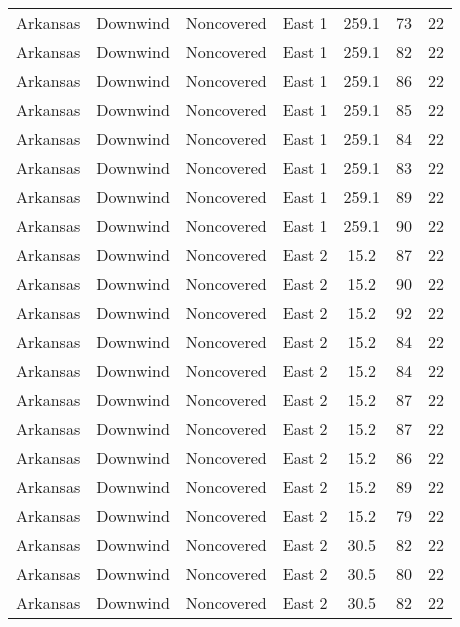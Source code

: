 \documentclass{article}
\begin{document}
\begin{longtable}[H]{ccccccc}
Arkansas & Downwind  & Noncovered & East 1        & 259.1        & 73          & 22  \\
Arkansas & Downwind  & Noncovered & East 1        & 259.1        & 82          & 22  \\
Arkansas & Downwind  & Noncovered & East 1        & 259.1        & 86          & 22  \\
Arkansas & Downwind  & Noncovered & East 1        & 259.1        & 85          & 22  \\
Arkansas & Downwind  & Noncovered & East 1        & 259.1        & 84          & 22  \\
Arkansas & Downwind  & Noncovered & East 1        & 259.1        & 83          & 22  \\
Arkansas & Downwind  & Noncovered & East 1        & 259.1        & 89          & 22  \\
Arkansas & Downwind  & Noncovered & East 1        & 259.1        & 90          & 22  \\
Arkansas & Downwind  & Noncovered & East 2        & 15.2         & 87          & 22  \\
Arkansas & Downwind  & Noncovered & East 2        & 15.2         & 90          & 22  \\
Arkansas & Downwind  & Noncovered & East 2        & 15.2         & 92          & 22  \\
Arkansas & Downwind  & Noncovered & East 2        & 15.2         & 84          & 22  \\
Arkansas & Downwind  & Noncovered & East 2        & 15.2         & 84          & 22  \\
Arkansas & Downwind  & Noncovered & East 2        & 15.2         & 87          & 22  \\
Arkansas & Downwind  & Noncovered & East 2        & 15.2         & 87          & 22  \\
Arkansas & Downwind  & Noncovered & East 2        & 15.2         & 86          & 22  \\
Arkansas & Downwind  & Noncovered & East 2        & 15.2         & 89          & 22  \\
Arkansas & Downwind  & Noncovered & East 2        & 15.2         & 79          & 22  \\
Arkansas & Downwind  & Noncovered & East 2        & 30.5         & 82          & 22  \\
Arkansas & Downwind  & Noncovered & East 2        & 30.5         & 80          & 22  \\
Arkansas & Downwind  & Noncovered & East 2        & 30.5         & 82          & 22  \\

\end{longtable}
\end{document}
